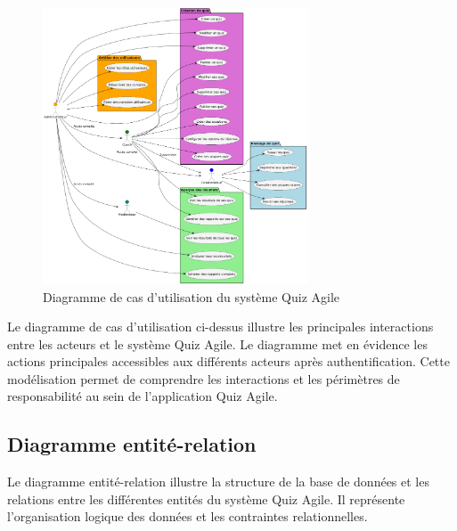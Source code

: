\documentclass[12pt,a4paper]{report}
\begin{document}
\begin{figure}[htbp]
    \centering
    \includegraphics[width=0.7\textwidth]{latex_media/media/image14.png}
    \caption{Diagramme de cas d'utilisation du système Quiz Agile}
    \label{fig:cas-utilisation}
\end{figure}

Le diagramme de cas d'utilisation ci-dessus illustre les principales interactions entre les acteurs et le système Quiz Agile. Le diagramme met en évidence les actions principales accessibles aux différents acteurs après authentification. Cette modélisation permet de comprendre les interactions et les périmètres de responsabilité au sein de l'application Quiz Agile.

\subsection{Diagramme entité-relation}

Le diagramme entité-relation illustre la structure de la base de données et les relations entre les différentes entités du système Quiz Agile. Il représente l'organisation logique des données et les contraintes relationnelles.
\end{document}
